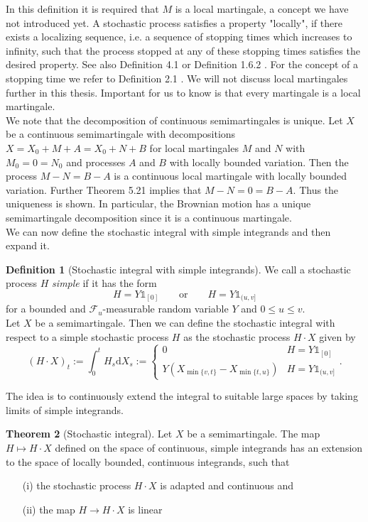 \documentclass[11pt,titlepage]{article}
\theoremstyle{definition}
\newtheorem{theorem}{Theorem}[section]
\newtheorem{definition}[theorem]{Definition}
\theoremstyle{remark}
\begin{document}
	In this definition it is required that $M$ is a local martingale, a concept we have not introduced 
	yet. A stochastic process satisfies a property "locally", if there exists a localizing sequence, i.e. a sequence of stopping times which increases to infinity, such that the process stopped at any of these stopping times satisfies the desired property. See also Definition 4.1 \cite{StoProSchmidt2021} or Definition 1.6.2 \cite{StoProTappe2018}. For the concept of a stopping time we refer to Definition 2.1 \cite{StoProSchmidt2021}. We will not discuss local martingales further in this thesis. Important for us to know is that every martingale is a local martingale.\\
	We note that the decomposition of continuous semimartingales is unique. 
	Let $X$ be a continuous semimartingale with decompositions $X=X_0 + M + A = X_0 + N + B$ for local martingales 
	$M$ and $N$ with $M_0=0=N_0$ and processes $A$ and $B$ with locally bounded variation. Then the process $M-N = B-A$ is a continuous local martingale with locally bounded variation. Further Theorem 
	5.21 \cite{StoProSchmidt2021} implies that $M-N = 0 = B-A$. Thus the uniqueness is shown.
	In particular, the Brownian motion has a unique semimartingale decomposition since it is 
	a continuous martingale.\\
	We can now define the stochastic integral with simple integrands and then expand it. 
	\begin{definition}[Stochastic integral with simple integrands]
		We call a stochastic process $H$ \textsl{simple} if it has the form 
		\[H = Y \mathds{1}_{[0]} \qquad \text{or}\qquad H = Y\mathds{1}_{(u,v]}\]
		for a bounded and $\mathcal{F}_u$-measurable random variable $Y$ and $0\leq u\leq v$. \\
		Let $X$ be a semimartingale. Then we can define the stochastic integral with respect 
		to a simple stochastic process $H$ as the stochastic process $H\cdot X$ given by
		\[ (H\cdot X)_t := \int_0^t H_s \mathrm{d}X_s := \begin{cases}
			0 & H=Y \mathds{1}_{[0]} \\
			Y\left(X_{\min\{v,t\}} - X_{\min\{t, u\}}\right) & H = Y\mathds{1}_{(u,v]}
		\end{cases}.\]
	\end{definition}

	The idea is to continuously extend the integral to suitable large spaces by taking limits of simple integrands.
	
	\begin{theorem}[Stochastic integral]
		Let $X$ be a semimartingale. The map $H\mapsto H\cdot X$ defined on the 
		space of continuous, simple integrands has an extension to the space of locally bounded, continuous integrands, such that 
		\begin{itemize}
			\item[(i)] the stochastic process $H\cdot X$ is adapted and continuous and
			\item[(ii)] the map $H\to H\cdot X$ is linear
		\end{itemize}
	\end{theorem}
	
\end{document}

